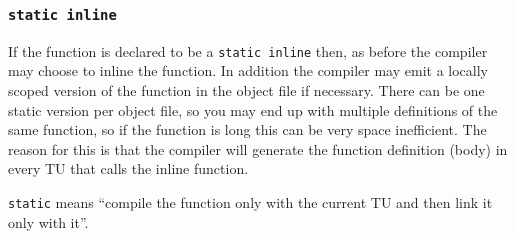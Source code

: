 \subsubsection{\texttt{static inline}}

If the function is declared to be a \texttt{static inline} then, as before the compiler may choose to inline the function. In addition the compiler may emit a locally scoped version of the function in the object file if necessary. There can be one static version per object file, so you may end up with multiple definitions of the same function, so if the function is long this can be very space inefficient. The reason for this is that the compiler will generate the function definition (body) in every TU that calls the inline function. 
\begin{takeaway}
\textup{\texttt{static}} means ``compile the function only with the current TU and then link it only with it''.
\end{takeaway}

